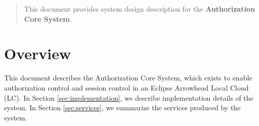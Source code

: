 \documentclass[a4paper]{arrowhead}
\begin{document}
\ArrowheadDate{\today}
\ArrowheadSetup

\begin{center}
  \vspace*{1cm}
  \huge{\arrowtitle}

  \vspace*{0.2cm}
  \LARGE{\arrowtype}
  \vspace*{1cm}

  \vspace*{\fill}


  \vspace*{1cm}
  \vspace*{\fill}

  \begin{abstract}
    This document provides system design description for the \textbf{Authorization Core System}.
  \end{abstract}

  \vspace*{1cm}

 \end{center}

\newpage

\tableofcontents
\newpage

\section{Overview}
\label{sec:overview}
\color{black}
This document describes the Authorization Core System, which exists to enable authorization control and session control in an Eclipse Arrowhead Local Cloud (LC). In Section \ref{sec:implementation}, we describe implementation details of the system. In Section \ref{sec:services}, we summarize the services produced by the system.
\end{document}
